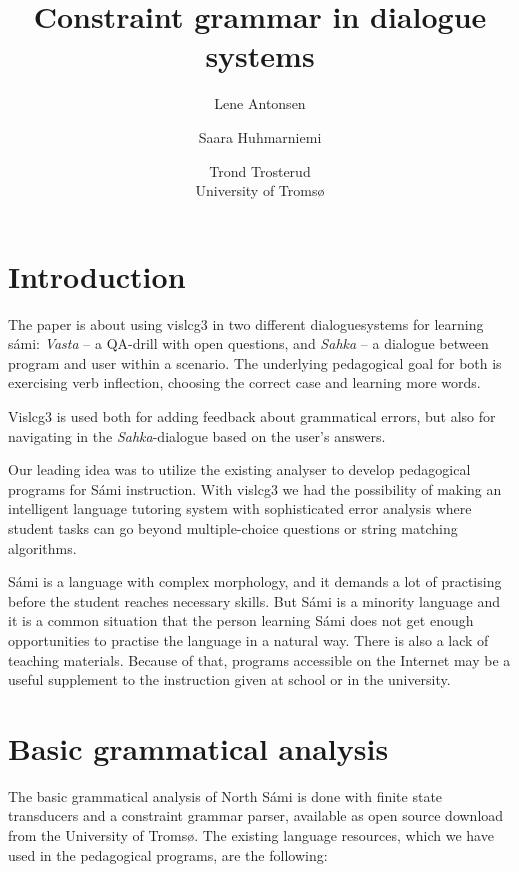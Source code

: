\documentclass[11pt]{article}
\title{Constraint grammar in dialogue systems}
\author{Lene Antonsen  \and
              Saara Huhmarniemi \and Trond Trosterud \\ University of Tromsø}
\begin{document}

\maketitle
{}
 
\maketitle



\section{Introduction} 

The paper is about using vislcg3 in two different dialoguesystems for learning sámi: \textit{Vasta} -- a QA-drill with open questions, and \textit{Sahka} -- a  dialogue between program and user within a scenario. The underlying pedagogical goal for both is exercising verb inflection, choosing the correct case and learning more words. 



Vislcg3 is used both for adding feedback about grammatical errors, but also for navigating in the \textit{Sahka}-dialogue based on the user's answers. 

Our leading idea was to utilize the existing analyser to develop pedagogical programs for Sámi instruction. With vislcg3 we had the possibility of making an intelligent language tutoring system with sophisticated error analysis where student tasks can go beyond multiple-choice questions or string matching algorithms. 

Sámi is a language with complex morphology, and it demands a lot of practising before the student reaches necessary skills. But Sámi is a minority language and it is a common situation that the person learning Sámi does not get enough opportunities to practise the language in a natural way. There is also a lack of teaching materials. Because of that, programs accessible on the Internet may be a useful supplement to the instruction given at school or in the university. 

\section{Basic grammatical analysis}
The basic grammatical analysis of North Sámi is done with finite state transducers and a constraint grammar parser, available as open source download from the University of Tromsø. The existing language resources, which we have used in the pedagogical programs, are the following:
\end{document}
